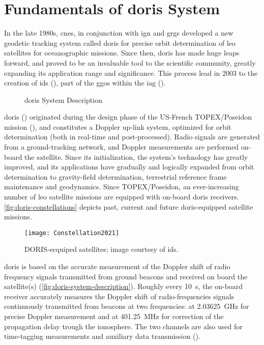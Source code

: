 \section{Fundamentals of \gls{doris} System}\label{sec:doris-system-fundamentals}
In the late 1980s, \gls{cnes}, in conjunction with \gls{ign} and \gls{grgs} developed 
a new geodetic tracking system called \gls{doris} for precise orbit determination 
of \gls{leo} satellites for oceanographic missions. Since then, \gls{doris} has 
made huge leaps forward, and proved to be an invaluable tool to the scientific community, 
greatly expanding its application range and significance. This process lead in 
2003 to the creation of \gls{ids} (\cite{Willis2016}), part of the \gls{ggos} 
within the \gls{iag} (\cite{Willis2006}). 

\begin{figure}
  \centering
  
  \caption{\gls{doris} System Description}
  \label{fig:doris-system-description}
\end{figure}

\gls{doris} (\cite{Barlier2005}) originated during the design phase of the US-French 
TOPEX/Poseidon mission (\cite{Fu1994}), 
and constitutes a Doppler up-link system, optimized for orbit determination (both 
in real-time and post-processed). Radio signals are generated from a ground-tracking 
network, and Doppler measurements are performed on-board the satellite. Since its 
initialization, the system's technology has greatly improved, and its applications 
have gradually and logically expanded from orbit determination to gravity-field 
determination, terrestrial reference frame maintenance and geodynamics. Since TOPEX/Poseidon, an 
ever-increasing number of \gls{leo} satellite missions are equipped with on-board 
\gls{doris} receivers. \autoref{fig:doris-constellations} depicts past, current and 
future \gls{doris}-equipped satellite missions.

\begin{figure}[h!]
  \centering
  \texttt{[image: Constellation2021]}
  \caption{DORIS-ecquiped satellites; image courtesy of \gls{ids}.}
  \label{fig:doris-constellations}
\end{figure}

\gls{doris} is based on the accurate measurement of the Doppler shift of radio 
frequency signals transmitted from ground beacons and received on board the 
satellite(s) (\autoref{fig:doris-system-description}). Roughly every \SI{10}{\second}, 
the on-board receiver accurately measures 
the Doppler shift of radio-frequencies signals continuously transmitted from 
beacons at two frequencies: at \SI{2.03625}{\GHz} for precise Doppler measurement 
and at \SI{401.25}{\MHz} for correction of the propagation delay trough the 
ionosphere. The two channels are also used for time-tagging measurements and 
auxiliary data transmission (\cite{Auriol2010}).

